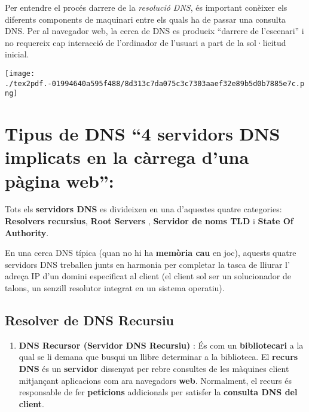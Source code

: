 \documentclass[]{article}
\providecommand{\tightlist}{%
  \setlength{\itemsep}{0pt}\setlength{\parskip}{0pt}}
\begin{document}
Per entendre el procés darrere de la \emph{resolució DNS}, és important
conèixer els diferents components de maquinari entre els quals ha de
passar una consulta DNS. Per al navegador web, la cerca de DNS es
produeix ``darrere de l'escenari'' i no requereix cap interacció de
l'ordinador de l'usuari a part de la sol·licitud inicial.

\texttt{[image: ./tex2pdf.-01994640a595f488/8d313c7da075c3c7303aaef32e89b5d0b7885e7c.png]}

\hypertarget{tipus-de-dns-4-servidors-dns-implicats-en-la-cuxe0rrega-duna-puxe0gina-web}{%
\section{\texorpdfstring{\textbf{Tipus de DNS ``4 servidors DNS
implicats en la càrrega d'una pàgina
web'':}}{Tipus de DNS ``4 servidors DNS implicats en la càrrega d'una pàgina web'':}}\label{tipus-de-dns-4-servidors-dns-implicats-en-la-cuxe0rrega-duna-puxe0gina-web}}

Tots els \textbf{servidors DNS} es divideixen en una d'aquestes quatre
categories: \textbf{Resolvers recursius}, \textbf{Root Servers} ,
\textbf{Servidor de noms TLD} i \textbf{State Of Authority}.

En una cerca DNS típica (quan no hi ha \textbf{memòria cau} en joc),
aquests quatre servidors DNS treballen junts en harmonia per completar
la tasca de lliurar l' adreça IP d'un domini especificat al client (el
client sol ser un solucionador de talons, un senzill resolutor integrat
en un sistema operatiu).

\hypertarget{resolver-de-dns-recursiu}{%
\subsection{\texorpdfstring{\textbf{Resolver de DNS
Recursiu}}{Resolver de DNS Recursiu}}\label{resolver-de-dns-recursiu}}

\begin{enumerate}
\def\labelenumi{\arabic{enumi}.}
\tightlist
\item
  \textbf{DNS Recursor (Servidor DNS Recursiu)} : És com un
  \textbf{bibliotecari} a la qual se li demana que busqui un llibre
  determinar a la biblioteca. El \textbf{recurs DNS} és un
  \textbf{servidor} dissenyat per rebre consultes de les màquines client
  mitjançant aplicacions com ara navegadors \textbf{web}. Normalment, el
  recurs és responsable de fer \textbf{peticions} addicionals per
  satisfer la \textbf{consulta DNS del client}.
\end{enumerate}
\end{document}
